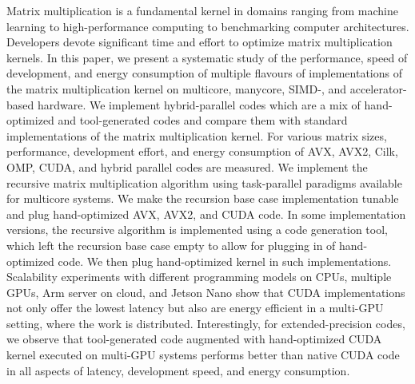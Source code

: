 Matrix multiplication is a fundamental kernel in domains ranging from machine learning to high-performance computing to benchmarking computer architectures. Developers devote significant time and effort to optimize matrix multiplication kernels. In this paper, we present a systematic study of 
 the performance, speed of development, and energy consumption of multiple flavours of implementations of the matrix multiplication kernel on multicore, manycore, SIMD-, and accelerator- based hardware. We implement hybrid-parallel codes which are a mix of hand-optimized and tool-generated codes and compare them with standard implementations of the matrix multiplication kernel. For various matrix sizes, performance, development effort, and energy consumption of AVX, AVX2, Cilk, OMP, CUDA, and hybrid parallel codes are measured. 
 We implement the recursive matrix multiplication algorithm using task-parallel paradigms available for multicore systems. We make the recursion base case implementation tunable and plug hand-optimized AVX, AVX2, and CUDA code. In some implementation versions, the recursive algorithm is implemented using a code generation tool, which left the recursion base case empty to allow for plugging in of hand-optimized code. We then plug hand-optimized kernel in such implementations. Scalability experiments with different programming models on CPUs, multiple GPUs, Arm server on cloud, and Jetson Nano show that  CUDA implementations not only offer the lowest latency but also are energy efficient in a multi-GPU setting, where the work is distributed. Interestingly, for extended-precision codes, we observe that tool-generated code augmented with hand-optimized CUDA kernel executed on multi-GPU systems performs better than native CUDA code in all aspects of latency, development speed, and energy consumption. 